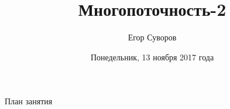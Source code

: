\documentclass[utf8,xcolor=table]{beamer}
\title{Многопоточность-2}
\author{Егор Суворов}
\institute[СПб АУ]{Курс <<Парадигмы и языки программирования>>, подгруппа 3}
\date[13.11.2017]{Понедельник, 13 ноября 2017 года}
\begin{document}
\begin{frame}
\titlepage
\end{frame}

\begin{frame}{План занятия}
	\tableofcontents
\end{frame}







\end{document}

